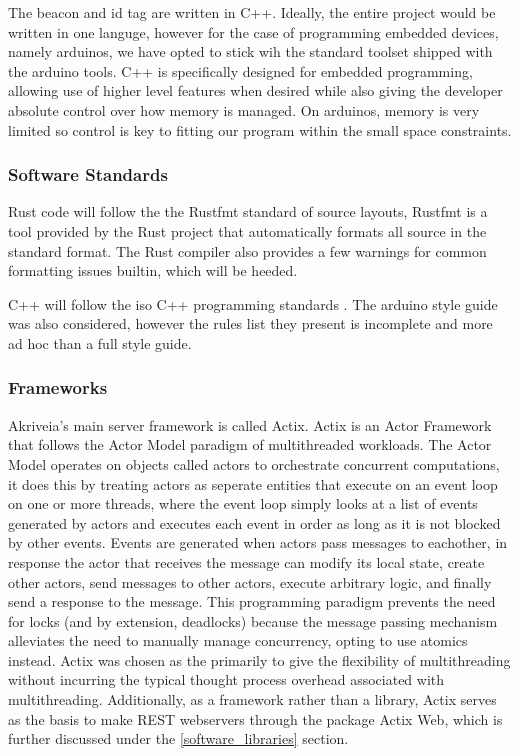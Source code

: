 \bigskip
The beacon and id tag are written in C++.
Ideally, the entire project would be written in one languge, however for the case of programming embedded devices, namely arduinos, we have opted to stick wih the standard toolset shipped with the arduino tools.
C++ is specifically designed for embedded programming, allowing use of higher level features when desired while also giving the developer absolute control over how memory is managed.
On arduinos, memory is very limited so control is key to fitting our program within the small space constraints.


\bigskip
\subsubsection{Software Standards}
Rust code will follow the the Rustfmt standard of source layouts, Rustfmt is a tool provided by the Rust project that automatically formats all source in the standard format. The Rust compiler also provides a few warnings for common formatting issues builtin, which will be heeded.

\bigskip
C++ will follow the iso C++ programming standards \cite{cpp_core_guidelines}. The arduino style guide \cite{arduino_style_guide} was also considered, however the rules list they present is incomplete and more ad hoc than a full style guide.

\subsubsection{Frameworks}
Akriveia's main server framework is called Actix.
Actix is an Actor Framework that follows the Actor Model paradigm of multithreaded workloads.
The Actor Model operates on objects called actors to orchestrate concurrent computations, it does this by treating actors as seperate entities that execute on an event loop on one or more threads, where the event loop simply looks at a list of events generated by actors and executes each event in order as long as it is not blocked by other events.
Events are generated when actors pass messages to eachother, in response the actor that receives the message can modify its local state, create other actors, send messages to other actors, execute arbitrary logic, and finally send a response to the message.
This programming paradigm prevents the need for locks (and by extension, deadlocks) because the message passing mechanism alleviates the need to manually manage concurrency, opting to use atomics instead.
\bigskip
Actix was chosen as the primarily to give the flexibility of multithreading without incurring the typical thought process overhead associated with multithreading. Additionally, as a framework rather than a library, Actix serves as the basis to make REST webservers through the package Actix Web, which is further discussed under the \ref{software_libraries} section.

